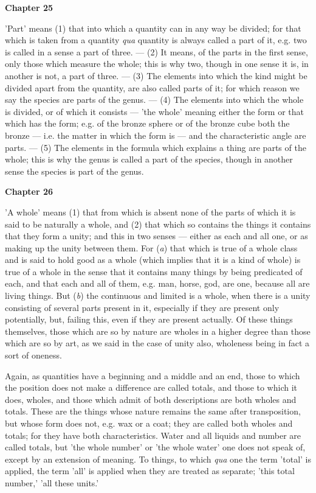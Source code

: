 \textbf{Chapter 25}

'Part' means (1) that into which a quantity can in any way be divided; for that which is taken from a quantity \emph{qua} quantity is always called a part of it, e.g. two is called in a sense a part of three. — (2) It means, of the parts in the first sense, only those which measure the whole; this is why two, though in one sense it is, in another is not, a part of three. — (3) The elements into which the kind might be divided apart from the quantity, are also called parts of it; for which reason we say the species are parts of the genus. — (4) The elements into which the whole is divided, or of which it consists — 'the whole' meaning either the form or that which has the form; e.g. of the bronze sphere or of the bronze cube both the bronze — i.e. the matter in which the form is — and the characteristic angle are parts. — (5) The elements in the formula which explains a thing are parts of the whole; this is why the genus is called a part of the species, though in another sense the species is part of the genus.

\textbf{Chapter 26}

'A whole' means (1) that from which is absent none of the parts of which it is said to be naturally a whole,
and (2) that which so contains the things it contains that they form a unity; and this in two senses — either as each and all one, or as making up the unity between them. For (\emph{a}) that which is true of a whole class and is said to hold good as a whole (which implies that it is a kind of whole) is true of a whole in the sense that it contains many things by being predicated of each, and that each and all of them, e.g. man, horse, god, are one, because all are living things. But (\emph{b}) the continuous and limited is a whole, when there is a unity consisting of several parts present in it, especially if they are present only potentially, but, failing this, even if they are present actually. Of these things themselves, those which are so by nature are wholes in a higher degree than those which are so by art, as we said in the case of unity also, wholeness being
in fact a sort of oneness.

Again, as quantities have a beginning and a middle and an end, those to which the position does not make a difference are called totals, and those to which it does, wholes, and those which admit of both descriptions are both wholes and totals. These are the things whose nature remains the same after transposition, but whose form does not, e.g. wax or a coat; they are called both wholes and totals; for they have both characteristics. Water and all liquids and number are called totals, but 'the whole number' or 'the whole water' one does not speak of, except by an extension of meaning. To things, to which \emph{qua} one the term 'total' is applied, the term 'all' is applied when they are treated as separate; 'this total number,' 'all these units.'

